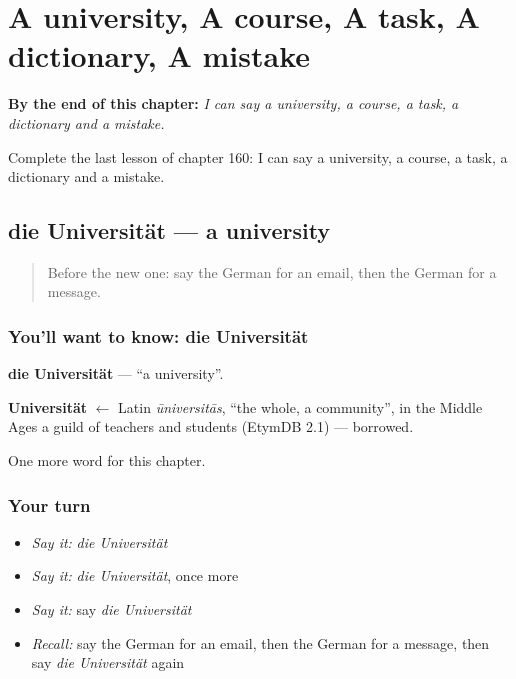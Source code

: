 
\chapter{A university, A course, A task, A dictionary, A mistake}
\label{ch:ge-a-university-a-course-a-task-a-dictionary-a-mistake}

\begin{chapteropening}
\textbf{By the end of this chapter:} \emph{I can say a university, a course, a task, a dictionary and a mistake.}

Complete the last lesson of chapter 160: I can say a university, a course, a task, a dictionary and a mistake.
\end{chapteropening}

\section[die Universität]{die Universität — a university}

\label{lesson:GE-C160-universitaet}



\begin{quote}
Before the new one: say the German for an email, then the German for a message.
\end{quote}

\subsection*{You'll want to know: die Universität}
\textbf{die Universität} — \textquotedblleft{}a university\textquotedblright{}.

\begin{cousinweb}
\textbf{Universität} $\leftarrow$ Latin \emph{ūniversitās}, \textquotedblleft{}the whole, a community\textquotedblright{}, in the Middle Ages a guild of teachers and students (EtymDB 2.1) — borrowed.
\end{cousinweb}

\begin{grammarlens}[title={What you've built}]
One more word for this chapter.
\end{grammarlens}

\subsection*{Your turn}
\begin{itemize}
\raggedright
  \item \emph{Say it:} \emph{die Universität}
  \item \emph{Say it:} \emph{die Universität}, once more
  \item \emph{Say it:} say \emph{die Universität}
  \item \emph{Recall:} say the German for an email, then the German for a message, then say \emph{die Universität} again
\end{itemize}

